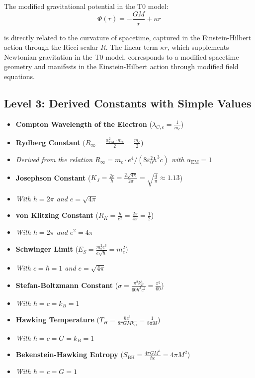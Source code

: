 \documentclass[12pt,a4paper]{article}
\newcommand{\alphaEM}{\alpha_{\text{EM}}}
\begin{document}
	The modified gravitational potential in the T0 model:
	\[
	\Phi(r) = -\frac{GM}{r} + \kappa r
	\]
	
	is directly related to the curvature of spacetime, captured in the Einstein-Hilbert action through the Ricci scalar $R$. The linear term $\kappa r$, which supplements Newtonian gravitation in the T0 model, corresponds to a modified spacetime geometry and manifests in the Einstein-Hilbert action through modified field equations.
	
	\subsection*{Level 3: Derived Constants with Simple Values}
	\begin{itemize}[itemsep=0.5em]
		\item \textbf{Compton Wavelength of the Electron} (\(\lambda_{C,e} = \frac{1}{m_e}\))
		\item \textbf{Rydberg Constant} (\(R_\infty = \frac{\alphaEM^2 \cdot m_e}{2} = \frac{m_e}{2}\))
		\item[] \textit{Derived from the relation $R_\infty = m_e\cdot e^4/(8\varepsilon_0^2h^3c)$ with $\alphaEM = 1$}
		\item \textbf{Josephson Constant} (\(K_J = \frac{2e}{h} = \frac{2\sqrt{4\pi}}{2\pi} = \sqrt{\frac{4}{\pi}} \approx 1.13\))
		\item[] \textit{With $h = 2\pi$ and $e = \sqrt{4\pi}$}
		\item \textbf{von Klitzing Constant} (\(R_K = \frac{h}{e^2} = \frac{2\pi}{4\pi} = \frac{1}{2}\))
		\item[] \textit{With $h = 2\pi$ and $e^2 = 4\pi$}
		\item \textbf{Schwinger Limit} (\(E_S = \frac{m_e^2c^3}{e\sqrt{\hbar}} = m_e^2\))
		\item[] \textit{With $c = \hbar = 1$ and $e = \sqrt{4\pi}$}
		\item \textbf{Stefan-Boltzmann Constant} (\(\sigma = \frac{\pi^2k_B^4}{60\hbar^3c^2} = \frac{\pi^2}{60}\))
		\item[] \textit{With $\hbar = c = k_B = 1$}
		\item \textbf{Hawking Temperature} (\(T_H = \frac{\hbar c^3}{8\pi GMk_B} = \frac{1}{8\pi M}\))
		\item[] \textit{With $\hbar = c = G = k_B = 1$}
		\item \textbf{Bekenstein-Hawking Entropy} (\(S_{\mathrm{BH}} = \frac{4\pi GM^2}{\hbar c} = 4\pi M^2\))
		\item[] \textit{With $\hbar = c = G = 1$}
	\end{itemize}
	
\end{document}
